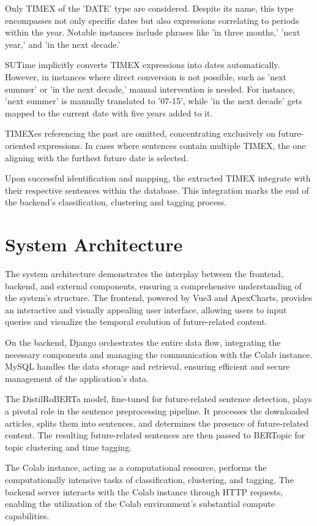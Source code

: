 \documentclass[a4paper,10pt]{report} %
\begin{document}
Only TIMEX of the 'DATE' type are considered. Despite its name, this type encompasses not only specific dates but also expressions correlating to periods within the year. Notable instances include phrases like 'in three months,' 'next year,' and 'in the next decade.'

SUTime implicitly converts TIMEX expressions into dates automatically. However, in instances where direct conversion is not possible, such as 'next summer' or 'in the next decade,' manual intervention is needed. For instance, 'next summer' is manually translated to '07-15', while 'in the next decade' gets mapped to the current date with five years added to it.

TIMEXes referencing the past are omitted, concentrating exclusively on future-oriented expressions. In cases where sentences contain multiple TIMEX, the one aligning with the furthest future date is selected.

Upon successful identification and mapping, the extracted TIMEX integrate with their respective sentences within the database. This integration marks the end of the backend's classification, clustering and tagging process.

\section{System Architecture}
The system architecture demonstrates the interplay between the frontend, backend, and external components, ensuring a comprehensive understanding of the system's structure. The frontend, powered by Vue3 and ApexCharts, provides an interactive and visually appealing user interface, allowing users to input queries and visualize the temporal evolution of future-related content.

On the backend, Django orchestrates the entire data flow, integrating the necessary components and managing the communication with the Colab instance. MySQL handles the data storage and retrieval, ensuring efficient and secure management of the application's data.

The DistilRoBERTa model, fine-tuned for future-related sentence detection, plays a pivotal role in the sentence preprocessing pipeline. It processes the downloaded articles, splits them into sentences, and determines the presence of future-related content. The resulting future-related sentences are then passed to BERTopic for topic clustering and time tagging.

The Colab instance, acting as a computational resource, performs the computationally intensive tasks of classification, clustering, and tagging. The backend server interacts with the Colab instance through HTTP requests, enabling the utilization of the Colab environment's substantial compute capabilities.
\end{document}
